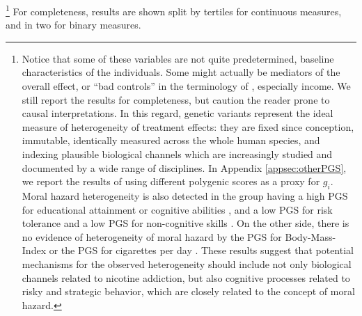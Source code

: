 \documentclass[11pt]{article}
\begin{document}
\footnote{Notice that some of these variables are not quite predetermined, baseline characteristics of the individuals. Some might actually be mediators of the overall effect, or ``bad controls'' in the terminology of \cite{Angrist2008}, especially income. We still report the results for completeness, but caution the reader prone to causal interpretations.
In this regard, genetic variants represent the ideal measure of heterogeneity of treatment effects: they are fixed since conception, immutable, identically measured across the whole human species, and indexing plausible biological channels which are increasingly studied and documented by a wide range of disciplines.
In Appendix \ref{appsec:otherPGS}, we report the results of using different polygenic scores as a proxy for $g_i$.
Moral hazard heterogeneity is also detected in the group having a high PGS for educational attainment or cognitive abilities \citep{Lee2018}, and a low PGS for risk tolerance \citep{KarlssonLinner2019} and a low PGS for non-cognitive skills \citep{Demange2020}.
On the other side, there is no evidence of heterogeneity of moral hazard by the PGS for Body-Mass-Index \citep{Yengo2018} or the PGS for cigarettes per day \citep{GSCAN2019gwas}.
These results suggest that potential mechanisms for the observed heterogeneity should include not only biological channels related to nicotine addiction, but also cognitive processes related to risky and strategic behavior, which are closely related to the concept of moral hazard.
} %
For completeness, results are shown split by tertiles for continuous measures, and in two for binary measures.
\end{document}
